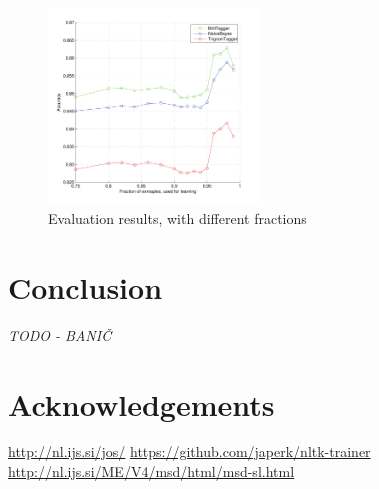 \documentclass[11pt, conference, compsocconf]{IEEEtran}
\begin{document}
\begin{figure}[htb]
\begin{center}
\leavevmode
\includegraphics[width=0.5\textwidth]{../evaluation/graph.pdf} 
\end{center}
\caption{Evaluation results, with different fractions}
\label{fig:evaluation}
\end{figure}

\section{Conclusion}
\textit{TODO - BANIČ}

\section*{Acknowledgements}

\begin{thebibliography}{99}
 \url{http://nl.ijs.si/jos/}
 \url{https://github.com/japerk/nltk-trainer}
 \url{http://nl.ijs.si/ME/V4/msd/html/msd-sl.html}
\end{thebibliography}
\end{document}
